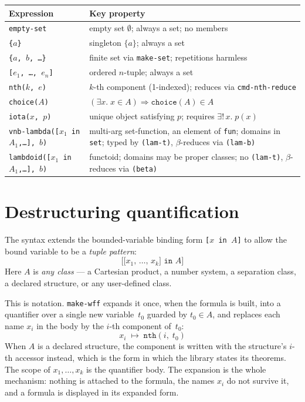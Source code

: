 \begin{center}
\footnotesize
\begin{tabular}{@{}p{5.2cm}p{7.1cm}@{}}
\toprule
Expression & Key property \\
\midrule
\texttt{empty-set} & empty set $\emptyset$; always a set; no members \\[2pt]
\texttt{\{$a$\}} & singleton $\{a\}$; always a set \\[2pt]
\texttt{\{$a$, $b$, \ldots\}} & finite set via \texttt{make-set}; repetitions harmless \\[2pt]
\texttt{[$e_1$, \ldots, $e_n$]} & ordered $n$-tuple; always a set \\[2pt]
\texttt{nth($k$, $e$)} & $k$-th component (1-indexed); reduces via \texttt{cmd-nth-reduce} \\[2pt]
\texttt{choice($A$)} & $(\exists x.\;x\in A) \Rightarrow \texttt{choice}(A) \in A$ \\[2pt]
\texttt{iota($x$, $p$)} & unique object satisfying $p$; requires $\exists!\,x.\;p(x)$ \\[2pt]
\texttt{vnb-lambda([$x_1$ in $A_1$,\ldots], $b$)} & multi-arg set-function, an element of \texttt{fun}; domains in \texttt{set}; typed by \texttt{(lam-t)}, $\beta$-reduces via \texttt{(lam-b)} \\[2pt]
\texttt{lambdoid([$x_1$ in $A_1$,\ldots], $b$)} & functoid; domains may be proper classes; no \texttt{(lam-t)}, $\beta$-reduces via \texttt{(beta)} \\
\bottomrule
\end{tabular}
\end{center}


\section{Destructuring quantification}

The syntax extends the bounded-variable binding form
\texttt{[$x$ in $A$]} to allow the bound variable to be a
\emph{tuple pattern}:
\[
  \texttt{[[$x_1$, \ldots, $x_k$] in $A$]}
\]
Here $A$ is \emph{any class} --- a Cartesian product, a number system,
a separation class, a declared structure, or any user-defined class.

This is notation.  \texttt{make-wff} expands it once, when the formula is
built, into a quantifier over a single new variable~$t_0$ guarded by
$t_0 \in A$, and replaces each name $x_i$ in the body by the $i$-th
component of~$t_0$:
\[
  x_i \;\longmapsto\; \texttt{nth}(i,\; t_0)
\]
When $A$ is a declared structure, the component is written with the
structure's $i$-th accessor instead, which is the form in which the
library states its theorems.  The scope of $x_1, \ldots, x_k$ is the
quantifier body.  The expansion is the whole mechanism: nothing is
attached to the formula, the names $x_i$ do not survive it, and a formula
is displayed in its expanded form.

